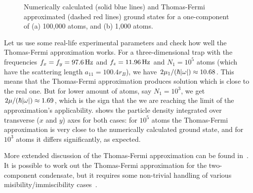 \begin{figure}
\begin{center}
\end{center}
\caption{Numerically calculated (solid blue lines) and Thomas-Fermi approximated (dashed red lines) ground states for a one-component \Rb{}  of (a) 100,000 atoms, and (b) 1,000 atoms.}
\label{fig:bec-noise:mean-field:tf-vs-accurate}
\end{figure}

Let us use some real-life experimental parameters and check how well the Thomas-Fermi approximation works.
For a three-dimensional trap with the frequencies $f_x = f_y = 97.6\mbox{\ensuremath{\,\mathrm{Hz}}}$ and $f_z = 11.96\mbox{\ensuremath{\,\mathrm{Hz}}}$ and $N_1=10^5$ \Rb{} atoms (which have the scattering length $a_{11} = 100.4 r_B$), we have $2 \mu_1 / (\hbar |\mathbf{\omega}|) \approx 10.68$.
This means that the Thomas-Fermi approximation produces solution which is close to the real one.
But for lower amount of atoms, say $N_1=10^3$, we get $2 \mu / (\hbar |\mathbf{\omega}|) \approx 1.69$, which is the sign that the we are reaching the limit of the approximation's applicability.
 shows the particle density integrated over transverse ($x$ and $y$) axes for both cases: for $10^5$ atoms the Thomas-Fermi approximation is very close to the numerically calculated ground state, and for $10^3$ atoms it differs significantly, as expected.

More extended discussion of the Thomas-Fermi approximation can be found in~\cite{Dalfovo1999}.
It is possible to work out the Thomas-Fermi approximation for the two-component condensate, but it requires some non-trivial handling of various misibility/immiscibility cases~\cite{Anderson2010}.
